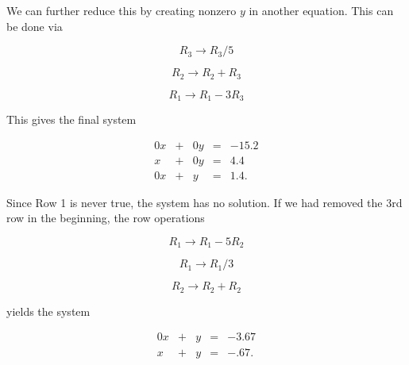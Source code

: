 \documentclass{ximera}
\begin{document}
\begin{exploration}
\begin{example}
\begin{solution}
            We can further reduce this by creating nonzero $y$ in another equation. This can be done via
    
            $$R_3\rightarrow R_3/5$$
    
            $$R_2\rightarrow R_2+R_3$$
    
            $$R_1\rightarrow R_1-3R_3$$
    
            This gives the final system
    
            $$\begin{array}{ccccc}
                    0x & +&0y&=&-15.2 \\
                    x& +&0y&=&4.4 \\
                    0x& +&y&=&1.4.
                \end{array}$$
    
            Since Row 1 is never true, the system has no solution. If we had removed the 3rd row in the beginning, the row operations 
    
            $$R_1\rightarrow R_1-5R_2$$
    
            $$R_1\rightarrow R_1/3$$
    
            $$R_2\rightarrow R_2+R_2$$
    
            yields the system
    
            $$\begin{array}{ccccc}
                    0x & +&y&=&-3.67 \\
                    x& +&y&=&-.67.
                \end{array}$$
    
        \end{solution}
    
    \end{example}

  \end{exploration}
    
     
\end{document}
